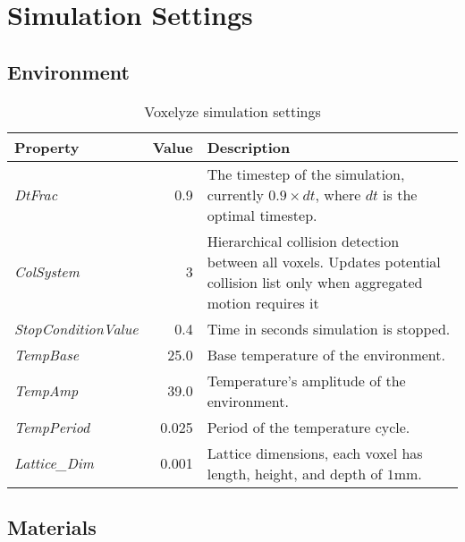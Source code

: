 
\chapter{Simulation Settings} %

\label{AppendixA} %



\section{Environment}

\begin{table}[h!]
\caption{Voxelyze simulation settings}
\label{VoxelyzeSimulationSettings}
\begin{center}
    \begin{tabular}{l r p{9cm}}
    \textbf{Property} & \textbf{Value} & \textbf{Description}\\
    \hline
    \emph{DtFrac} & 0.9 & The timestep of the simulation, currently $0.9 \times dt$, where $dt$ is the optimal timestep.\\
    \emph{ColSystem}        & 3 & Hierarchical collision detection between all voxels. Updates potential collision list only when aggregated motion requires it\footnote.\\
    \emph{StopConditionValue} & 0.4 & Time in seconds simulation is stopped.\\
    \emph{TempBase} & 25.0 & Base temperature of the environment.\\
    \emph{TempAmp} & 39.0 & Temperature's amplitude of the environment.\\
    \emph{TempPeriod} & 0.025 & Period of the temperature cycle.\\
    \emph{Lattice\_Dim} & 0.001 & Lattice dimensions, each voxel has length, height, and depth of $1$mm.
    \end{tabular}
    \end{center}
\end{table}




\section{Materials}

